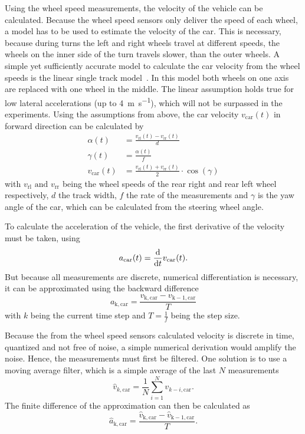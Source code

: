 Using the wheel speed measurements, the velocity of the vehicle can be calculated.
Because the wheel speed sensors only deliver the speed of each wheel, a model has to be used to estimate the velocity of the car.
This is necessary, because during turns the left and right wheels travel at different speeds, the wheels on the inner side of the turn travels slower, than the outer wheels.
A simple yet sufficiently accurate model to calculate the car velocity from the wheel speeds is the linear single track model~\cite{Mitschke2014}.
In this model both wheels on one axis are replaced with one wheel in the middle.
The linear assumption holds true for low lateral accelerations (up to \SI{4}{\metre\per\second}), which will not be surpassed in the experiments.
Using the assumptions from above, the car velocity $v_\mathrm{car}(t)$ in forward direction can be calculated by
\begin{align}
    \alpha(t)         & = \frac{v_\mathrm{rl}(t) - v_\mathrm{rr}(t)}{d}                  \\
    \gamma(t)         & = \frac{\alpha(t)}{f}                                            \\
    v_\mathrm{car}(t) & = \frac{v_\mathrm{rl}(t) + v_\mathrm{rr}(t)}{2}\cdot\cos(\gamma)
    \label{eq:v_car}
\end{align}
with $v_\mathrm{rl} \text{ and } v_\mathrm{rr}$ being the wheel speeds of the rear right and rear left wheel respectively, $d$ the track width, $f$ the rate of the measurements and $\gamma$ is the yaw angle of the car, which can be calculated from the steering wheel angle.

To calculate the acceleration of the vehicle, the first derivative of the velocity must be taken, using
\begin{equation}
    a_\mathrm{car}(t) = \dv{t}v_\mathrm{car}(t).
\end{equation}
But because all measurements are discrete, numerical differentiation is necessary, it can be approximated using the backward difference
\begin{equation}
    a_\mathrm{k, car} = \frac{v_\mathrm{k, car} - v_\mathrm{k - 1, car}}{T}
\end{equation}
with $k$ being the current time step and $T=\frac{1}{f}$ being the step size.

Because the from the wheel speed sensors calculated velocity is discrete in time, quantized and not free of noise, a simple numerical derivation would amplify the noise.
Hence, the measurements must first be filtered.
One solution is to use a moving average filter, which is a simple average of the last $N$ measurements
\begin{equation}
    \hat{v}_{k, \mathrm{car}} = \frac{1}{N}\sum_{i=1}^N v_{k - i, \mathrm{car}}.
\end{equation}
The finite difference of the approximation can then be calculated as
\begin{equation}
    \label{eq:v_car_diff}
    \hat{a}_\mathrm{k, car} = \frac{\hat{v}_\mathrm{k, car} - \hat{v}_\mathrm{k - 1, car}}{T}.
\end{equation}

